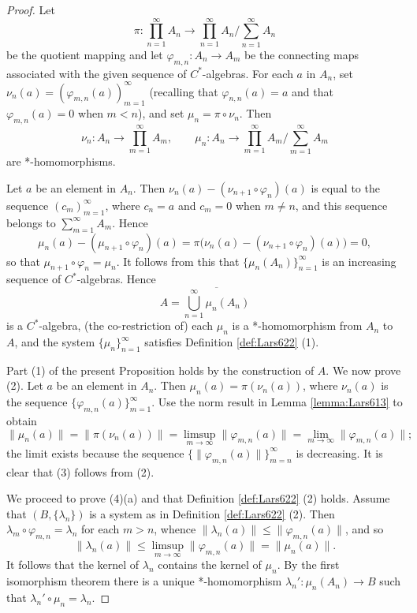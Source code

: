 \documentclass{book}
\def\cstar{\(C^*\)-algebra}
\def\cstars{\(C^*\)-algebras}
\begin{document}
\begin{proof}
  Let 
  \[
    \pi:\prod_{n=1}^{\infty}A_n\to\prod_{n=1}^{\infty}A_n \Big/\sum_{n=1}^\infty A_n
  \]
  be the quotient mapping and let \(\varphi_{m,n}:A_n\to A_m\) be the connecting maps
  associated with the given sequence of \cstars. For each \(a\) in \(A_n\), set \(\nu_n(a)=(\varphi_{m,n}(a))_{m=1}^\infty\)
  (recalling that \(\varphi_{n,n}(a)=a\) and that \(\varphi_{m,n}(a)=0\) when \(m< n\)), and set \(\mu_n=\pi\circ\nu_n\). Then
  \[
    \nu_n:A_n\to\prod_{m=1}^\infty A_m,\qquad\mu_n:A_n\to\prod_{m=1}^\infty A_m\Big/\sum_{m=1}^\infty A_m
  \]
  are *-homomorphisms.\par
  Let \(a\) be an element in \(A_n\). Then \(\nu_n(a)-(\nu_{n+1}\circ\varphi_n)(a)\) is equal to the
  sequence \((c_m)_{m=1}^\infty\), where \(c_n=a\) and \(c_m=0\) when \(m\neq n\), and this sequence belongs to 
  \(\sum_{m=1}^\infty A_m\). Hence
  \[
    \mu_n(a)-(\mu_{n+1}\circ\varphi_n)(a)
    =\pi\bigl(\nu_n(a)-(\nu_{n+1}\circ\varphi_n)(a)\bigr)=0,
  \]
  so that \(\mu_{n+1}\circ\varphi_n=\mu_n\). It follows from this that \(\{\mu_n(A_n)\}_{n=1}^\infty\)
  is an increasing sequence of \cstars. Hence
  \[
    A=\overline{\bigcup_{n=1}^\infty\mu_n(A_n)}
  \]
  is a \cstar, (the co-restriction of) each \(\mu_n\) is a *-homomorphism from \(A_n\) to \(A\), and the system \(\{\mu_n\}_{n=1}^\infty\) satisfies Definition \ref{def:Lars622} (1).\par
  Part (1) of the present Proposition holds by the construction of \(A\). We now prove (2). Let \(a\) be an element in \(A_n\).
  Then \(\mu_n(a)=\pi(\nu_n(a))\), where \(\nu_n(a)\) is the sequence \(\{\varphi_{m,n}(a)\}_{m=1}^\infty\).
  Use the norm result in Lemma \ref{lemma:Lars613} to obtain 
  \[
    \|\mu_n(a)\|=\|\pi(\nu_n(a))\|=\limsup_{m\to\infty}\|\varphi_{m,n}(a)\|=\lim_{m\to\infty}\|\varphi_{m,n}(a)\|;
  \]
  the limit exists because the sequence \(\{\|\varphi_{m,n}(a)\|\}_{m=n}^\infty\) is decreasing. It is clear that (3) follows from (2).\par
  We proceed to prove (4)(a) and that Definition \ref{def:Lars622} (2) holds.
  Assume that \((B,\{\lambda_n\})\) is a system as in Definition \ref{def:Lars622} (2). Then 
  \(\lambda_m\circ\varphi_{m,n}=\lambda_n\) for each \(m>n\), whence \(\|\lambda_n(a)\|\leq\|\varphi_{m,n}(a)\|\), and so
  \[
    \|\lambda_n(a)\|\leq\limsup_{m\to\infty}\|\varphi_{m,n}(a)\|=\|\mu_n(a)\|.
  \]
  It follows that the kernel of \(\lambda_n\) contains the kernel of \(\mu_n\). By the first isomorphism theorem
  there is a unique *-homomorphism \(\lambda_n':\mu_n(A_n)\to B\) such that \(\lambda_n'\circ\mu_n=\lambda_n\).

\end{proof}
\end{document}
